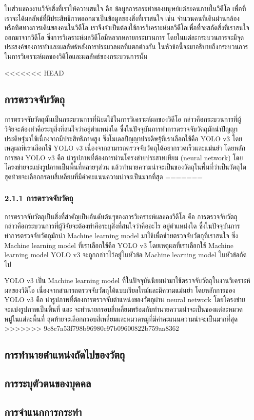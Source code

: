 ในส่วนของงานวิจัยสิ่งที่เราให้ความสนใจ คือ ข้อมูลการกระทำของมนุษย์แต่ละคนภายในวิดีโอ เพื่อที่เราจะได้ผลลัพธ์ที่มีประสิทธิภาพออกมาเป็นข้อมูลของสิ่งที่เราสนใจ เช่น จำนวนคนที่เดินผ่านกล้อง 
หรือทิศทางการเดินของคนในวิดีโอ เราจึงจำเป็นต้องใช้การวิเคราะห์ผลวิดีโอเพื่อที่จะสกัดสิ่งที่เราสนใจออกมาจากวิดีโอ ซึ่งการวิเคราะห์ผลวิดีโอมีหลากหลายกระบวนการ 
โดยในแต่ละกระบวนการจะมีจุดประสงค์ของการทำและผลลัพธ์หลังการประมวลผลที่แตกต่างกัน ในหัวข้อนี้จะมาอธิบายถึงกระบวนการในการวิเคราะห์ผลของวิดิโอและผลลัพธ์ของกระบวนการนั้น

<<<<<<< HEAD
\subsection{การตรวจจับวัตถุ}
การตรวจจับวัตถุนั้นเป็นกระบวนการที่นิยมใช้ในการวิเคราะห์ผลของวิดีโอ กล่าวคือกระบวนการที่ผู้วิจัยจะต้องทำคือระบุสิ่งที่สนใจว่าอยู่ตำแหน่งใด 
ซึ่งในปัจจุบันการทำการตรวจจับวัตถุมักนำปัญญาประดิษฐ์มาใช้เนื่องจากมีประสิทธิภาพสูง ซึ่งโมเดลปัญญาประดิษฐ์ที่เราเลือกใช้คือ YOLO v3 
โดยเหตุผลที่เราเลือกใช้ YOLO v3 เนื่องจากสามารถตรวจจับวัตถุได้อยากรวดเร็วและแม่นยำ โดยหลักการของ YOLO v3 คือ นำรูปภาพที่ต้องการผ่านโครงข่ายประสาทเทียม (neural network)
โดยโครงข่ายจะแบ่งรูปภาพเป็นพื้นที่หลายๆส่วน แล้วทำนายความน่าจะเป็นของวัตถุในพื้นที่ว่าเป็นวัตถุใด สุดท้ายจะเลือกกรอบสี่เหลี่ยมที่มีค่าคะแนนความน่าจะเป็นมากที่สุด
=======
\subsubsection*{2.1.1 การตรวจจับวัตถุ}
การตรวจจับวัตถุเป็นสิ่งที่สำคัญเป็นอันดับต้นๆของการวิเคราะห์ผลของวิดีโอ คือ การตรวจจับวัตถุ กล่าวคือกระบวนการที่ผู้วิจัยจะต้องทำคือระบุสิ่งที่สนใจว่าคืออะไร อยู่ตำแหน่งใด ซึ่งในปัจจุบันการทำการตรวจจับวัตถุมักนำ Machine learning model มาใช้เพื่อช่วยตรวจจับวัตถุที่เราสนใจ ซึ่ง Machine learning model ที่เราเลือกใช้คือ YOLO v3 โดยเหตุผลที่เราเลือกใช้ Machine learning model YOLO v3 จะถูกกล่าวไว้อยู่ในหัวข้อ Machine learning model ในหัวข้อถัดไป
\clearpage
\par
YOLO v3 เป็น Machine learning model ที่ในปัจจุบันนิยมนำมาใช้ตรวจจับวัตถุในงานวิเคราะห์ผลของวิดีโอ เนื่องจากสามารถตรวจจับวัตถุได้แบบเรียลไทม์และมีความแม่นยำ โดยหลักการของ YOLO v3 คือ นำรูปภาพที่ต้องการตรวจจับตำแหน่งของวัตถุผ่าน neural network โดยโครงข่ายจะแบ่งรูปภาพเป็นพื้นที่ และ จะทำนายกรอบสี่เหลี่ยมพร้อมกับทำนายความน่าจะเป็นของแต่ละหมวดหมู่ในแต่ละพื้นที่ สุดท้ายจะเลือกกรอบสี่เหลี่ยมและหมวดหมู่ที่มีค่าคะแนนความน่าจะเป็นมากที่สุด
>>>>>>> 9c8c7a53f798b96980c97b09600822b759aa8362

\clearpage
\subsection{การทำนายตำแหน่งถัดไปของวัตถุ}


\subsection{การระบุตัวตนของบุคคล}


\subsection{การจำแนกการกระทำ}
